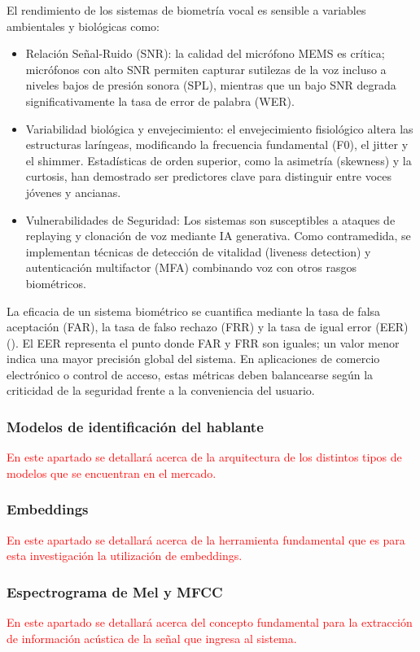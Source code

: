 El rendimiento de los sistemas de biometría vocal es sensible a variables ambientales y
biológicas como:
\begin{itemize}
    \item  Relación Señal-Ruido (SNR): la calidad del micrófono MEMS es crítica; micrófonos con
alto SNR permiten capturar sutilezas de la voz incluso a niveles bajos de presión sonora
(SPL), mientras que un bajo SNR degrada significativamente la tasa de error de palabra
(WER).
    \item Variabilidad biológica y envejecimiento: el envejecimiento fisiológico altera las
estructuras laríngeas, modificando la frecuencia fundamental (F0), el jitter y el shimmer.
Estadísticas de orden superior, como la asimetría (skewness) y la curtosis, han demostrado ser
predictores clave para distinguir entre voces jóvenes y ancianas.
    \item Vulnerabilidades de Seguridad: Los sistemas son susceptibles a ataques de replaying y
clonación de voz mediante IA generativa. Como contramedida, se implementan técnicas de
detección de vitalidad (liveness detection) y autenticación multifactor (MFA) combinando voz
con otros rasgos biométricos.
\end{itemize}

La eficacia de un sistema biométrico se cuantifica mediante la tasa de falsa aceptación
(FAR), la tasa de falso rechazo (FRR) y la tasa de igual error (EER) (\cite{brydinskyi}).
El EER representa el punto donde FAR y FRR son iguales; un valor menor indica una mayor
precisión global del sistema. En aplicaciones de comercio electrónico o control de acceso,
estas métricas deben balancearse según la criticidad de la seguridad frente a la conveniencia
del usuario.

\subsubsection{Modelos de identificación del hablante}
\textcolor{red}{En este apartado se detallará acerca de la arquitectura de los distintos tipos de 
modelos que se encuentran en el mercado.}

\subsubsection{Embeddings}
\textcolor{red}{En este apartado se detallará acerca de la herramienta fundamental que es 
para esta investigación la utilización de embeddings.}

\subsubsection{Espectrograma de Mel y MFCC}
\textcolor{red}{En este apartado se detallará acerca del concepto fundamental para la extracción de 
información acústica de la señal que ingresa al sistema.}
